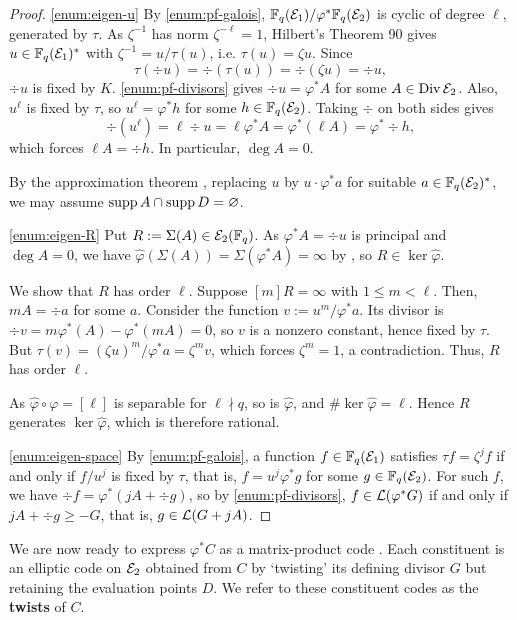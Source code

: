 \documentclass[twocolumn, 11pt]{scrartcl}
\begin{document}
\begin{proof}
\ref{enum:eigen-u} By \ref{enum:pf-galois}, $\mathbb{F}_q(\mathcal{E}_1)/\varphi^*\mathbb{F}_q(\mathcal{E}_2)$ is cyclic of degree $\ell$, generated by $\tau$. As $\zeta^{-1}$ has norm $\zeta^{-\ell}=1$, Hilbert's Theorem 90 \cite[Thm.~VI.6.1]{lang2002algebra} gives $u\in\mathbb{F}_q(\mathcal{E}_1)^*$ with $\zeta^{-1}=u/\tau(u)$, i.e. $\tau(u)=\zeta u$. Since
\[ \tau(\div u)=\div(\tau(u))=\div(\zeta u)=\div u,\]
$\div u$ is fixed by $K$. \ref{enum:pf-divisors} gives $\div u=\varphi^*A$ for some $A\in\operatorname{Div}\mathcal{E}_2$. Also, $u^\ell$ is fixed by $\tau$, so $u^\ell=\varphi^*h$ for some $h\in\mathbb{F}_q(\mathcal{E}_2)$. Taking $\div$ on both sides gives
\[ \div(u^\ell)=\ell\div u=\ell\varphi^*A=\varphi^*(\ell A)=\varphi^*\div h,\]
which forces $\ell A=\div h$. In particular, $\deg A=0$.

By the approximation theorem \cite[Thm.~1.3.1]{stichtenoth2009algebraic}, replacing $u$ by $u\cdot\varphi^*a$ for suitable $a\in\mathbb{F}_q(\mathcal{E}_2)^*$, we may assume $\operatorname{supp} A\cap\operatorname{supp} D=\varnothing$.

\ref{enum:eigen-R} Put $R:=\Sigma(A)\in\mathcal{E}_2(\mathbb{F}_q)$. As $\varphi^*A=\div u$ is principal and $\deg A=0$, we have $\hat\varphi(\Sigma(A))=\Sigma(\varphi^*A)=\infty$ by , so $R\in\ker\hat\varphi$.

We show that $R$ has order $\ell$. Suppose $[m]R=\infty$ with $1\leq m<\ell$. Then, $mA=\div a$ for some $a$. Consider the function $v:=u^m/\varphi^*a$. Its divisor is $\div v=m\varphi^*(A)-\varphi^*(mA)=0$, so $v$ is a nonzero constant, hence fixed by $\tau$. But $\tau(v)=(\zeta u)^m/\varphi^*a=\zeta^m v$, which forces $\zeta^m=1$, a contradiction. Thus, $R$ has order $\ell$.

As $\hat\varphi\circ\varphi=[\ell]$ is separable for $\ell\nmid q$, so is $\hat\varphi$, and $\#\ker\hat\varphi=\ell$. Hence $R$ generates $\ker\hat\varphi$, which is therefore rational.

\ref{enum:eigen-space} By \ref{enum:pf-galois}, a function $f\in\mathbb{F}_q(\mathcal{E}_1)$ satisfies $\tau f=\zeta^jf$ if and only if $f/u^j$ is fixed by $\tau$, that is, $f=u^j\varphi^*g$ for some $g\in\mathbb{F}_q(\mathcal{E}_2)$. For such $f$, we have $\div f=\varphi^*(jA+\div g)$, so by \ref{enum:pf-divisors}, $f\in\mathcal{L}(\varphi^*G)$ if and only if $jA+\div g\geq-G$, that is, $g\in\mathcal{L}(G+jA)$.
\end{proof}

We are now ready to express $\varphi^*C$ as a matrix-product code \cite{blackmore2001matrix}. Each constituent is an elliptic code on $\mathcal{E}_2$ obtained from $C$ by `twisting' its defining divisor $G$ but retaining the evaluation points $D$. We refer to these constituent codes as the \textbf{twists} of $C$.
\end{document}
